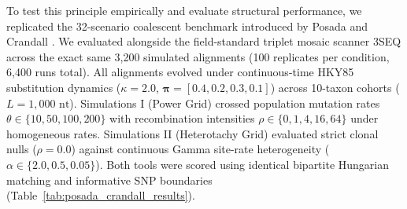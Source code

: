 To test this principle empirically and evaluate structural performance, we replicated the 32-scenario coalescent benchmark introduced by Posada and Crandall \cite{posada2001evaluation}.
We evaluated \RhizAeon alongside the field-standard triplet mosaic scanner 3SEQ across the exact same 3,200 simulated alignments (100 replicates per condition, 6,400 runs total).
All alignments evolved under continuous-time HKY85 substitution dynamics ($\kappa = 2.0$, $\bm{\pi} = [0.4, 0.2, 0.3, 0.1]$) across 10-taxon cohorts ($L = 1,000\text{ nt}$).
Simulations I (Power Grid) crossed population mutation rates $\theta \in \{10, 50, 100, 200\}$ with recombination intensities $\rho \in \{0, 1, 4, 16, 64\}$ under homogeneous rates.
Simulations II (Heterotachy Grid) evaluated strict clonal nulls ($\rho = 0.0$) against continuous Gamma site-rate heterogeneity ($\alpha \in \{2.0, 0.5, 0.05\}$).
Both tools were scored using identical bipartite Hungarian matching and informative SNP boundaries (Table~\ref{tab:posada_crandall_results}).

